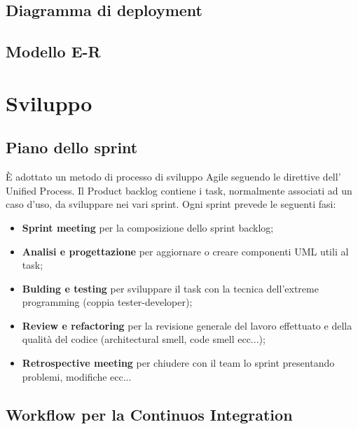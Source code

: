 \documentclass[12pt]{article}
\begin{document}
\subsection{Diagramma di deployment}
\subsection{Modello E-R}
\section{Sviluppo}
\subsection{Piano dello sprint}
\`{E} adottato un metodo di processo di sviluppo Agile seguendo le direttive dell' Unified Process. Il Product backlog contiene i task, normalmente associati ad un caso d'uso,  da sviluppare nei vari sprint. Ogni sprint prevede le seguenti fasi:
\begin{itemize}
\item {\textbf {Sprint meeting}} per la composizione dello sprint backlog;
\item {\textbf {Analisi e progettazione}}  per aggiornare o creare componenti UML utili al task;
\item {\textbf {Bulding e testing}}  per sviluppare il task con la tecnica dell'extreme programming (coppia tester-developer);
\item {\textbf {Review e refactoring}} per la revisione generale del lavoro effettuato e della qualità del codice (architectural smell, code smell ecc...);
\item {\textbf {Retrospective meeting}} per chiudere con il team lo sprint presentando problemi, modifiche ecc...

\end{itemize}

\subsection{Workflow per la Continuos Integration}


\end{document}
